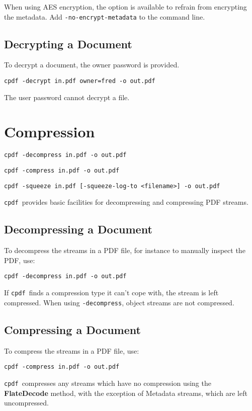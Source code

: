 \documentclass{book}
\newcommand{\cpdf}{\texttt{cpdf}}
\begin{document}
When using AES encryption, the option is available to refrain from encrypting the
metadata. Add \texttt{-no-encrypt-metadata} to the command line.

  \section{Decrypting a Document}
  To decrypt a document, the owner password is provided.
  \begin{framed}
    \small\verb!cpdf -decrypt in.pdf owner=fred -o out.pdf!
  \end{framed}
  \noindent The user password cannot decrypt a file.

\chapter{Compression}
  \begin{framed}
     \small\noindent\verb!cpdf -decompress in.pdf -o out.pdf!

     \vspace{1.5mm}
     \noindent\verb!cpdf -compress in.pdf -o out.pdf!
     
     \vspace{1.5mm}
     \noindent\verb!cpdf -squeeze in.pdf [-squeeze-log-to <filename>] -o out.pdf!  
   \end{framed}
  \cpdf\ provides basic facilities for decompressing and compressing PDF streams.
  \section{Decompressing a Document}
  To decompress the streams in a PDF file, for instance to manually inspect the
PDF, use:
  \begin{framed}
   \small\verb!cpdf -decompress in.pdf -o out.pdf!
  \end{framed}
  \noindent If \cpdf\ finds a compression type it can't cope with, the stream is left compressed. When using \texttt{-decompress}, object streams are not compressed.
  \section{Compressing a Document}
  To compress the streams in a PDF file, use:
  \begin{framed}
    \small\verb!cpdf -compress in.pdf -o out.pdf!
  \end{framed}
  \noindent\cpdf\ compresses any streams which have no compression using the
  \textbf{Flate\-Decode} method, with the exception of Metadata streams, which
  are left uncompressed.
  
\end{document}
